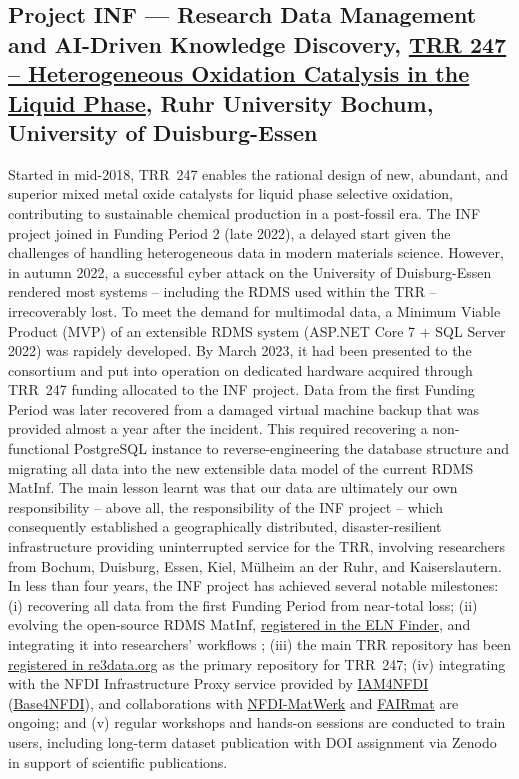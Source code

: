 \documentclass{eceasst}
\begin{document}
\subsection{Project INF --- Research Data Management and AI-Driven Knowledge Discovery, \href {https://gepris.dfg.de/gepris/projekt/388390466?language=en}{TRR 247 – Heterogeneous Oxidation Catalysis in the Liquid Phase}, Ruhr University Bochum, University of Duisburg-Essen}
Started in mid-2018, TRR~247 enables the rational design of new, abundant, and superior mixed metal oxide catalysts  for liquid phase selective oxidation, contributing to sustainable chemical production in a post-fossil era.
The INF project joined in Funding Period 2 (late 2022), a delayed start given the challenges of handling heterogeneous data in modern materials science.
However, in autumn 2022, a successful cyber attack on the University of Duisburg-Essen rendered most systems – including the RDMS used within the TRR – irrecoverably lost.
To meet the demand for multimodal data, a Minimum Viable Product (MVP) of an extensible RDMS system (ASP.NET Core 7 + SQL Server 2022) was rapidely developed.
By March 2023, it had been presented to the consortium and put into operation on dedicated hardware acquired through TRR~247 funding allocated to the INF project.
Data from the first Funding Period was later recovered from a damaged virtual machine backup that was provided almost a year after the incident.
This required recovering a non-functional PostgreSQL instance to reverse-engineering the database structure and migrating all data into the new extensible data model of the current RDMS MatInf.
The main lesson learnt was that our data are ultimately our own responsibility – above all, the responsibility of the INF project – which consequently established a geographically distributed, disaster-resilient infrastructure providing uninterrupted service for the TRR, involving researchers from Bochum, Duisburg, Essen, Kiel, Mülheim an der Ruhr, and Kaiserslautern.
In less than four years, the INF project has achieved several notable milestones: (i) recovering all data from the first Funding Period from near-total loss; (ii) evolving the open-source RDMS MatInf, \href{https://eln-finder.ulb.tu-darmstadt.de/items/8aefad94-9f2d-4b40-b94f-21c9419eb3be}{registered in the ELN Finder},  and integrating it into researchers’ workflows \cite{Dudarev2025}; (iii) the main TRR repository has been \href{https://doi.org/10.17616/R31NJNUG}{registered in re3data.org} as the primary repository for TRR~247; (iv) integrating with the NFDI Infrastructure Proxy service provided by \href{https://doc.nfdi-aai.de/}{IAM4NFDI} (\href{https://base4nfdi.de/}{Base4NFDI}), and collaborations with \href{https://nfdi-matwerk.de/}{NFDI-MatWerk} and \href{https://www.fairmat-nfdi.eu/}{FAIRmat} are ongoing; and (v) regular workshops and hands-on sessions are conducted to train users, including long-term dataset publication with DOI assignment via Zenodo in support of scientific publications.
\end{document}
